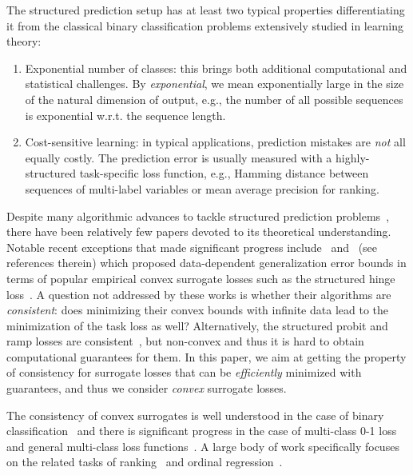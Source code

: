\documentclass{article}
\begin{document}
The structured prediction setup has at least two typical properties differentiating it from the classical binary classification problems extensively studied in learning theory:
\begin{enumerate}[topsep=-\parskip,noitemsep,itemindent=0.45cm,leftmargin=0.0cm]
    \item Exponential number of classes: this brings both additional computational and statistical challenges.
    By \emph{exponential}, we mean exponentially large in the size of the natural dimension of output, e.g., the number of all possible sequences is exponential w.r.t. the sequence length.
    \item Cost-sensitive learning: in typical applications, prediction mistakes are \emph{not} all equally costly. The prediction error is usually measured with a highly-structured task-specific loss function, e.g., Hamming distance between sequences of multi-label variables or mean average precision for ranking.
\end{enumerate}

\vspace{\parskip}Despite many algorithmic advances to tackle structured prediction problems~\citep{bakir2007predicting,nowozin2014structpred}, there have been relatively few papers devoted to its theoretical understanding. Notable recent exceptions that made significant progress include~\citet{cortes16} and~\citet{london16pac} (see references therein) which proposed data-dependent generalization error 
%
bounds in terms of popular empirical convex surrogate losses such as the structured hinge loss~\citep{taskar03,taskar2005learning,tsochantaridis05}.
A question not addressed by these works is whether their algorithms are \emph{consistent}: does minimizing their convex bounds with infinite data lead to the minimization of the task loss as well?
Alternatively, the structured probit and ramp losses are consistent~\cite{mcallester07,mcallester11}, but non-convex and thus it is hard to obtain computational guarantees for them.
In this paper, we aim at getting the property of consistency for surrogate losses that can be \emph{efficiently} minimized with guarantees, and thus we consider \emph{convex} surrogate losses.

The consistency of convex surrogates is well understood in the case of binary classification~\citep{zhang2004annals,bartlett06convexity,steinwart07} and there is significant progress in the case of multi-class 0-1 loss~\citep{zhang04,tewari07} and general multi-class loss functions~\citep{pires2013riskbounds,ramaswamy16calibrDim,williamson16}.
A large body of work specifically focuses on the related tasks of ranking~\cite{duchi10,calauzenes12,ramaswamy13rankSurrogates} and ordinal regression~\citep{pedregosa15ordivalreg}.\vspace{-0.5mm}
\end{document}
